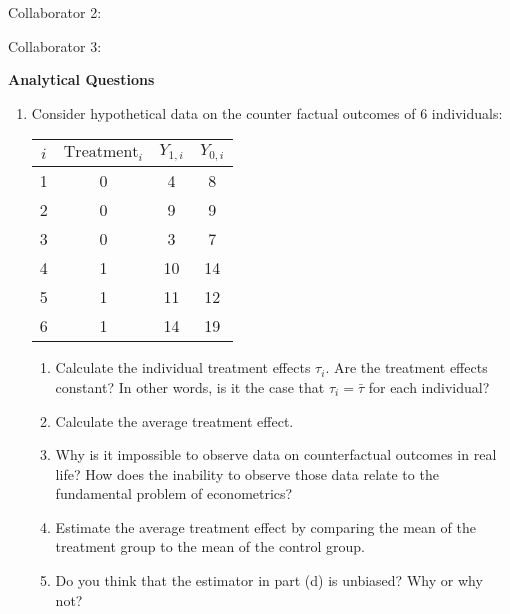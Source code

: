 \documentclass[11pt]{article}
\begin{document}
\begin{onehalfspacing}
Collaborator 2: \\
			
\vspace{0.1in}

Collaborator 3: 			

\newpage


\begin{center}
\textbf{Analytical Questions} \bigskip
\end{center}


\begin{enumerate}
	
\item Consider hypothetical data on the counter factual outcomes of 6 individuals:

\begin{table}[htb]
	\centering
	\begin{tabular}{c c c c}
		\toprule
		$i$ & $\text{Treatment}_i$ & $Y_{1,i}$ & $Y_{0,i}$  \\ \toprule
		1 & 0 & 4 & 8 \\
		2 & 0 & 9 & 9 \\
		3 & 0 & 3 & 7 \\
		4 & 1 & 10 & 14 \\
		5 & 1 & 11 & 12 \\
		6 & 1 & 14 & 19 \\
		\bottomrule
	\end{tabular}
\end{table}

\begin{enumerate}
	\item Calculate the individual treatment effects $\tau_i$. Are the treatment effects constant? In other words, is it the case that $\tau_i = \bar{\tau}$ for each individual?
	\item Calculate the average treatment effect.
	\item Why is it impossible to observe data on counterfactual outcomes in real life? How does the inability to observe those data relate to the fundamental problem of econometrics?
	\item Estimate the average treatment effect by comparing the mean of the treatment group to the mean of the control group. 
	\item Do you think that the estimator in part (d) is unbiased? Why or why not?
\end{enumerate}


\end{enumerate}
\end{onehalfspacing}
\end{document}
